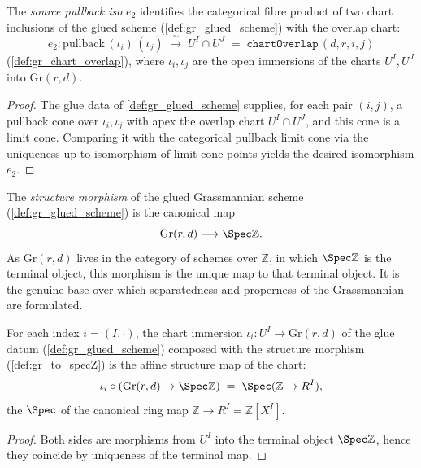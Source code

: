 \begin{definition}\leanok
  \label{def:gr_pullbackιIso}
  The \emph{source pullback iso} \(e_2\) identifies the categorical fibre product
  of two chart inclusions of the glued scheme (\cref{def:gr_glued_scheme}) with
  the overlap chart:
  \[
    e_2 : \mathrm{pullback}\,(\iota_i)\,(\iota_j) \;\xrightarrow{\;\sim\;}\;
    U^I \cap U^J \;=\; \texttt{chartOverlap}\,(d,r,i,j)
  \]
  (\cref{def:gr_chart_overlap}), where \(\iota_i, \iota_j\) are the open
  immersions of the charts \(U^I, U^J\) into \(\mathrm{Gr}(r,d)\).
\end{definition}
\begin{proof}
  \leanok
  The glue data of \cref{def:gr_glued_scheme} supplies, for each pair \((i,j)\), a
  pullback cone over \(\iota_i, \iota_j\) with apex the overlap chart \(U^I \cap
  U^J\), and this cone is a limit cone. Comparing it with the categorical
  pullback limit cone via the uniqueness-up-to-isomorphism of limit cone points
  yields the desired isomorphism \(e_2\).
\end{proof}

\begin{definition}\leanok
  \label{def:gr_to_specZ}
  The \emph{structure morphism} of the glued Grassmannian scheme
  (\cref{def:gr_glued_scheme}) is the canonical map
  \[
    \mathrm{Gr}(r,d) \longrightarrow \Spec \mathbb{Z} .
  \]
  As \(\mathrm{Gr}(r,d)\) lives in the category of schemes over \(\mathbb{Z}\), in
  which \(\Spec \mathbb{Z}\) is the terminal object, this morphism is the unique
  map to that terminal object. It is the genuine base over which separatedness and
  properness of the Grassmannian are formulated.
\end{definition}

\begin{lemma}\leanok
  \label{lem:gr_ι_toSpecZ}
  For each index \(i = (I, \cdot)\), the chart immersion \(\iota_i : U^I \to
  \mathrm{Gr}(r,d)\) of the glue datum (\cref{def:gr_glued_scheme}) composed with
  the structure morphism (\cref{def:gr_to_specZ}) is the affine structure map of
  the chart:
  \[
    \iota_i \circ (\mathrm{Gr}(r,d) \to \Spec \mathbb{Z})
      \;=\; \Spec(\mathbb{Z} \to R^I),
  \]
  the \(\Spec\) of the canonical ring map \(\mathbb{Z} \to R^I =
  \mathbb{Z}[X^I]\).
\end{lemma}
\begin{proof}
  \leanok
  Both sides are morphisms from \(U^I\) into the terminal object \(\Spec
  \mathbb{Z}\), hence they coincide by uniqueness of the terminal map.
\end{proof}

